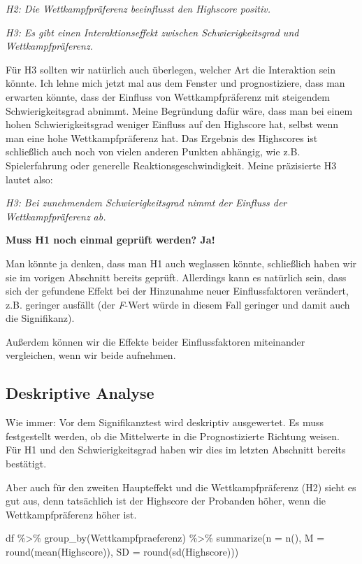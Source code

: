\documentclass[
]{book}
\newenvironment{Shaded}{\begin{snugshade}}{\end{snugshade}}
\newcommand{\AttributeTok}[1]{\textcolor[rgb]{0.77,0.63,0.00}{#1}}
\newcommand{\FunctionTok}[1]{\textcolor[rgb]{0.00,0.00,0.00}{#1}}
\newcommand{\NormalTok}[1]{#1}
\newcommand{\SpecialCharTok}[1]{\textcolor[rgb]{0.00,0.00,0.00}{#1}}
\begin{document}
\emph{H2: Die Wettkampfpräferenz beeinflusst den Highscore positiv.}

\emph{H3: Es gibt einen Interaktionseffekt zwischen Schwierigkeitsgrad und Wettkampfpräferenz.}

Für H3 sollten wir natürlich auch überlegen, welcher Art die Interaktion sein könnte. Ich lehne mich jetzt mal aus dem Fenster und prognostiziere, dass man erwarten könnte, dass der Einfluss von Wettkampfpräferenz mit steigendem Schwierigkeitsgrad abnimmt. Meine Begründung dafür wäre, dass man bei einem hohen Schwierigkeitsgrad weniger Einfluss auf den Highscore hat, selbst wenn man eine hohe Wettkampfpräferenz hat. Das Ergebnis des Highscores ist schließlich auch noch von vielen anderen Punkten abhängig, wie z.B. Spielerfahrung oder generelle Reaktionsgeschwindigkeit. Meine präzisierte H3 lautet also:

\emph{H3: Bei zunehmendem Schwierigkeitsgrad nimmt der Einfluss der Wettkampfpräferenz ab.}

\leavevmode\hypertarget{info_interactionanova}{}%
\textbf{Muss H1 noch einmal geprüft werden? Ja!}

Man könnte ja denken, dass man H1 auch weglassen könnte, schließlich haben wir sie im vorigen Abschnitt bereits geprüft. Allerdings kann es natürlich sein, dass sich der gefundene Effekt bei der Hinzunahme neuer Einflussfaktoren verändert, z.B. geringer ausfällt (der \emph{F}-Wert würde in diesem Fall geringer und damit auch die Signifikanz).

Außerdem können wir die Effekte beider Einflussfaktoren miteinander vergleichen, wenn wir beide aufnehmen.

\hypertarget{deskriptive-analyse-1}{%
\subsection{Deskriptive Analyse}\label{deskriptive-analyse-1}}

Wie immer: Vor dem Signifikanztest wird deskriptiv ausgewertet. Es muss festgestellt werden, ob die Mittelwerte in die Prognostizierte Richtung weisen. Für H1 und den Schwierigkeitsgrad haben wir dies im letzten Abschnitt bereits bestätigt.

Aber auch für den zweiten Haupteffekt und die Wettkampfpräferenz (H2) sieht es gut aus, denn tatsächlich ist der Highscore der Probanden höher, wenn die Wettkampfpräferenz höher ist.

\begin{Shaded}
\begin{Highlighting}[]
\NormalTok{df }\SpecialCharTok{\%\textgreater{}\%} 
  \FunctionTok{group\_by}\NormalTok{(Wettkampfpraeferenz) }\SpecialCharTok{\%\textgreater{}\%} 
  \FunctionTok{summarize}\NormalTok{(}\AttributeTok{n =} \FunctionTok{n}\NormalTok{(), }
            \AttributeTok{M =} \FunctionTok{round}\NormalTok{(}\FunctionTok{mean}\NormalTok{(Highscore)),}
            \AttributeTok{SD =} \FunctionTok{round}\NormalTok{(}\FunctionTok{sd}\NormalTok{(Highscore)))}
\end{Highlighting}
\end{Shaded}
\end{document}

